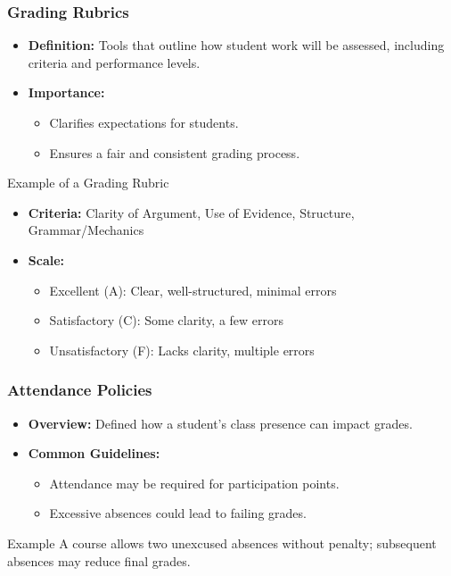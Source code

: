 \documentclass[aspectratio=169]{beamer}
\begin{document}
\begin{frame}[fragile]
    \frametitle{Grading Rubrics}
    \begin{itemize}
        \item \textbf{Definition:} Tools that outline how student work will be assessed, including criteria and performance levels.
        \item \textbf{Importance:} 
        \begin{itemize}
            \item Clarifies expectations for students.
            \item Ensures a fair and consistent grading process.
        \end{itemize}
    \end{itemize}
    \begin{block}{Example of a Grading Rubric}
        \begin{itemize}
            \item \textbf{Criteria:} Clarity of Argument, Use of Evidence, Structure, Grammar/Mechanics
            \item \textbf{Scale:}
                \begin{itemize}
                    \item Excellent (A): Clear, well-structured, minimal errors
                    \item Satisfactory (C): Some clarity, a few errors
                    \item Unsatisfactory (F): Lacks clarity, multiple errors
                \end{itemize}
        \end{itemize}
    \end{block}
\end{frame}

\begin{frame}[fragile]
    \frametitle{Attendance Policies}
    \begin{itemize}
        \item \textbf{Overview:} Defined how a student’s class presence can impact grades.
        \item \textbf{Common Guidelines:}
        \begin{itemize}
            \item Attendance may be required for participation points.
            \item Excessive absences could lead to failing grades.
        \end{itemize}
    \end{itemize}
    \begin{block}{Example}
        A course allows two unexcused absences without penalty; subsequent absences may reduce final grades.
    \end{block}
\end{frame}
\end{document}
